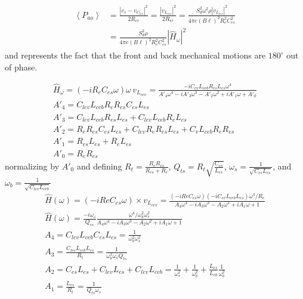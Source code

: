 \documentclass[10pt]{book}
\begin{document}
\begin{align}
\begin{split}
\left\langle P_{ao} \right\rangle &=\frac{\left| v_s -v_{C_{lev}} \right|^2}{2R_{er}}=\frac{\left| v_{L_{cev}} \right|^2}{2R_{er}}=\frac{S_d^2 \omega^2 \rho\left| v_{L_{cev}} \right|^2}{4\pi c (B \ell)^2R_{e}^2C_{es}^2}\\
&=\frac{S_d^2 \rho}{4\pi c (B \ell)^2R_{e}^2C_{es}^2}\left| \hat{H}_\omega \right|^2
\end{split}
\end{align}
and represents the fact that the front and back mechanical motions are $180^\circ$ out of phase.



\begin{align}
\hat{H}_\omega=(-i R_e C_{es} \omega) \omega \, v_{L_{cev}}= \frac{
-i  C_{ev} L_{ceb} R_{es} L_{es} \omega^4}
{A'_4\omega^4-iA'_3\omega^3-A'_2\omega^2+iA'_1\omega+A'_0}\\
A'_4=C_{lev} L_{ceb} R_e R_{es}  C_{es} L_{es}\\
A'_3=C_{lev} L_{ceb} R_{es} L_{es}
+ C_{lev} L_{ceb} R_e L_{es}\\
A'_2=R_e R_{es}  C_{es} L_{es}+C_{lev} R_e R_{es} L_{es}+C_v L_{ceb} R_e R_{es}\\
A'_1=R_{es} L_{es}+R_e L_{es}\\
A'_0=R_e R_{es}
\end{align}
normalizing by $A'_0$ and defining $R_t=\frac{R_eR_{es}}{R_{es}+R_e}$, $Q_{ts}=R_t\sqrt{\frac{C_{es}}{L_{es}}}$, $\omega_s=\frac{1}{\sqrt{C_{es}L_{es}}}$, and $\omega_b=\frac{1}{\sqrt{C_{lev}L_{ceb}}}$
\begin{align}
\hat{H}(\omega)=(-i Re C_{es} \omega) \times v_{L_{cev}}= \frac{
(-i Re C_{es} \omega)(-i  C_{ev} L_{ceb} L_{es}) \omega^4/R_e}
{A_4\omega^4-iA_3\omega^3-A_2\omega^2+iA_1\omega+1}\\
\hat{H}(\omega)= \frac{-i\omega_s}{Q_{es}}\frac{\omega^4/\omega_b^2 \omega_s^2}
{A_4\omega^4-iA_3\omega^3-A_2\omega^2+iA_1\omega+1}\\
A_4=C_{lev} L_{ceb} C_{es} L_{es}=\frac{1}{\omega_b^2\omega_s^2}\\
A_3=\frac{C_{lev} L_{ceb} L_{es}}{R_t}=\frac{1}{\omega_b^2\omega_s Q_{ts}}\\
A_2=C_{es} L_{es}+C_{lev} L_{es}+C_{lev} L_{ceb}=\frac{1}{\omega_s^2}+\frac{1}{\omega_b^2}+\frac{L_{es}}{L_{eb}}\frac{1}{\omega_b^2}\\
A_1=\frac{L_{es}}{R_t}=\frac{1}{Q_{ts}\omega_s}
\end{align}
\end{document}
